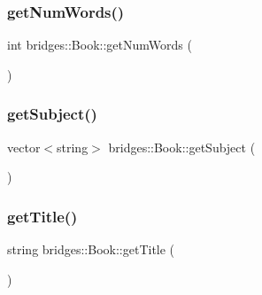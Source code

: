\hypertarget{classbridges_1_1_book_af3810d4dab23944d6cb83f6fb3a627d7}{}\label{classbridges_1_1_book_af3810d4dab23944d6cb83f6fb3a627d7} 
\subsubsection{\texorpdfstring{get\+Num\+Words()}{getNumWords()}}
{\footnotesize\ttfamily int bridges\+::\+Book\+::get\+Num\+Words (\begin{DoxyParamCaption}{ }\end{DoxyParamCaption})\hspace{0.3cm}{\ttfamily [inline]}}

\hypertarget{classbridges_1_1_book_aea7da4cd608fbccf1742f64913a314c0}{}\label{classbridges_1_1_book_aea7da4cd608fbccf1742f64913a314c0} 
\subsubsection{\texorpdfstring{get\+Subject()}{getSubject()}}
{\footnotesize\ttfamily vector$<$string$>$ bridges\+::\+Book\+::get\+Subject (\begin{DoxyParamCaption}{ }\end{DoxyParamCaption})\hspace{0.3cm}{\ttfamily [inline]}}

\hypertarget{classbridges_1_1_book_ab69bb95904587455af97c6fd6299bc1d}{}\label{classbridges_1_1_book_ab69bb95904587455af97c6fd6299bc1d} 
\subsubsection{\texorpdfstring{get\+Title()}{getTitle()}}
{\footnotesize\ttfamily string bridges\+::\+Book\+::get\+Title (\begin{DoxyParamCaption}{ }\end{DoxyParamCaption})\hspace{0.3cm}{\ttfamily [inline]}}

\hypertarget{classbridges_1_1_book_ade9cece412cf86a8d2e7a29c308c276a}{}\label{classbridges_1_1_book_ade9cece412cf86a8d2e7a29c308c276a} 
